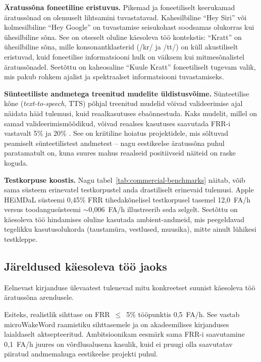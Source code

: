 \textbf{Äratussõna foneetiline eristuvus.} Pikemad ja foneetiliselt keerukamad äratussõnad on olemuselt lihtsamini tuvastatavad. Kahesilbiline \enquote{Hey Siri} või kolmesilbiline \enquote{Hey Google} on tuvastamise seisukohast soodsamas olukorras kui ühesilbiline sõna. See on otseselt oluline käesoleva töö kontekstis: \enquote{Kratt} on ühesilbiline sõna, mille konsonantklasterid (/kr/ ja /tt/) on küll akustiliselt eristuvad, kuid foneetilise informatsiooni hulk on väiksem kui mitmesõnalistel äratussõnadel. Seetõttu on kaheosaline \enquote{Kuule Kratt} foneetiliselt tugevam valik, mis pakub rohkem ajalist ja spektraalset informatsiooni tuvastamiseks.

\textbf{Sünteetiliste andmetega treenitud mudelite üldistusvõime.} Sünteetilise kõne (\emph{text-to-speech}, TTS) põhjal treenitud mudelid võivad valideerimise ajal näidata häid tulemusi, kuid reaalkasutuses ebaõnnestuda. Kaks mudelit, millel on samad valideerimismõõdikud, võivad reaalses kasutuses saavutada FRR-i vastavalt 5\% ja 20\% \cite{microwakeword2026}. See on kriitiline hoiatus projektidele, mis sõltuvad peamiselt sünteetilistest andmetest -- nagu eestikeelse äratussõna puhul paratamatult on, kuna suures mahus reaalseid positiivseid näiteid on raske koguda.

\textbf{Testkorpuse koostis.} Nagu tabel~\ref{tab:commercial-benchmarks} näitab, võib sama süsteem erinevatel testkorpustel anda drastiliselt erinevaid tulemusi. Apple HEiMDaL süsteemi 0,45\% FRR tihedakõnelisel testkorpusel tasemel 12,0~FA/h \cite{kundu2023heimdal} versus toodangusüsteemi $\sim$0,006~FA/h \cite{apple-heysiri2017} illustreerib seda selgelt. Seetõttu on käesoleva töö hindamises oluline kasutada ambient-andmeid, mis peegeldavad tegelikku kasutusolukorda (taustamüra, vestlused, muusika), mitte ainult lühikesi testkleppe.

\subsection{Järeldused käesoleva töö jaoks}\label{subsec:benchmark-implications}

Eelnevast kirjanduse ülevaatest tulenevad mitu konkreetset suunist käesoleva töö äratussõna arendusele.

Esiteks, realistlik sihttase on FRR~$\leq$~5\% tööpunktis 0,5~FA/h. See vastab microWakeWord raamistiku sihttasemele ja on akadeemilises kirjanduses laialdaselt aktsepteeritud. Ambitsioonikam eesmärk sama FRR-i saavutamine 0,1~FA/h juures on võrdlusalusena kasulik, kuid ei pruugi olla saavutatav piiratud andmemahuga eestikeelse projekti puhul.

